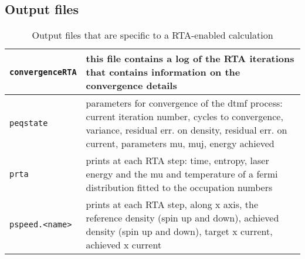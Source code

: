 \documentclass[11pt,a4paper]{article}
\begin{document}
		\subsection{Output files}
			\begin{table}[h!]
				\caption{Output files that are specific to a RTA-enabled calculation}\label{tab:dynamic-output-files-rta}
				\begin{tabular}{|p{4.5cm}|p{10.2cm}|}
					\hline
					\texttt{convergenceRTA} & this file contains a log of the RTA iterations that contains information on the convergence details\\
					\hline
					\texttt{peqstate} &  parameters for convergence of the dtmf process: current iteration number, cycles to convergence, variance, residual err. on density, residual err. on current, parameters mu, muj, energy achieved\\
					\hline
					\texttt{prta} & prints at each RTA  step: time, entropy, laser energy and the mu and temperature of a fermi distribution fitted to the occupation numbers\\
					\hline
					\texttt{pspeed.<name>} & prints at each RTA step, along x axis, the reference density (spin up and down), achieved density (spin up and down), target x current, achieved x current \\
					\hline
				\end{tabular}
			\end{table}
			
			
			
								
	
\end{document}
